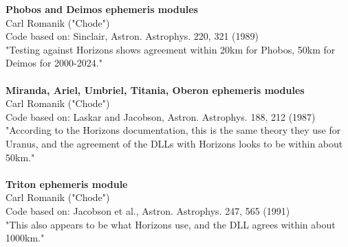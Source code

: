 \documentclass[Orbiter User Manual.tex]{subfiles}
\begin{document}
\textbf{Phobos and Deimos ephemeris modules}\\
Carl Romanik ("Chode")\\
Code based on: Sinclair, Astron. Astrophys. 220, 321 (1989)\\
"Testing against Horizons shows agreement within 20km for Phobos, 50km for Deimos for 2000-2024."\\
\\
\textbf{Miranda, Ariel, Umbriel, Titania, Oberon ephemeris modules}\\
Carl Romanik ("Chode")\\
Code based on: Laskar and Jacobson, Astron. Astrophys. 188, 212 (1987)\\
"According to the Horizons documentation, this is the same theory they use for Uranus, and the agreement of the DLLs with Horizons looks to be within about 50km."\\
\\
\textbf{Triton ephemeris module}\\
Carl Romanik ("Chode")\\
Code based on: Jacobson et al., Astron. Astrophys. 247, 565 (1991)\\
"This also appears to be what Horizons use, and the DLL agrees within about 1000km."

\end{document}
